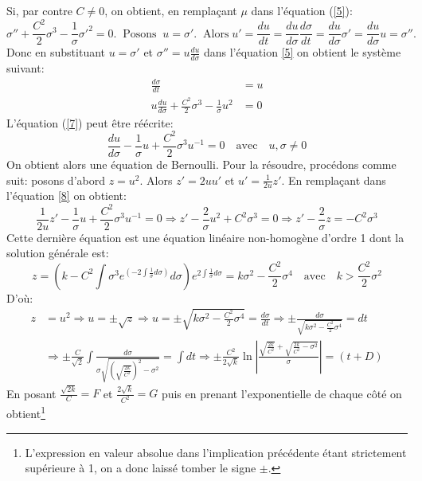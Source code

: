 \documentclass[11pt,french]{article}
\begin{document}
Si, par contre $C\neq 0$, on obtient, en remplaçant $\mu$ dans l'équation (\ref{5}): 
\begin{equation*}
   \sigma''+\frac{C^2}{2}\sigma^3-\frac{1}{\sigma}\sigma'^2=0.\;\;\text{Posons}\;\;u=\sigma'.\;\;\text{Alors}\;u'=\frac{du}{dt}=\frac{du}{d\sigma}\frac{d\sigma}{dt}=\frac{du}{d\sigma}\sigma'=\frac{du}{d\sigma}u=\sigma''.
\end{equation*}
Donc en substituant $u=\sigma'$ et $\sigma''=u\frac{du}{d\sigma}$ dans l'équation \eqref{5} on obtient le système suivant:
\begin{align}
    \frac{d\sigma}{dt}&=u\label{6}\\
    u\frac{du}{d\sigma}+\frac{C^2}{2}\sigma^3-\frac{1}{\sigma}u^2&=0\label{7} 
\end{align}
L'équation (\ref{7}) peut être réécrite:
\begin{equation}
    \frac{du}{d\sigma}-\frac{1}{\sigma}u+\frac{C^2}{2}\sigma^3u^{-1}=0\label{8}\quad\text{avec}\quad u, \sigma\neq0
\end{equation}
On obtient alors une équation de Bernoulli. Pour la résoudre, procédons comme suit: posons d'abord $z=u^2$. Alors $z'=2uu'$ et $u'=\frac{1}{2u}z'$. En remplaçant dans l'équation \eqref{8}  on obtient:
\begin{equation*} 
    \frac{1}{2u}z'-\frac{1}{\sigma}u+\frac{C^2}{2}\sigma^3u^{-1}=0\Longrightarrow z'-\frac{2}{\sigma}u^2+C^2\sigma^3=0\Longrightarrow z'-\frac{2}{\sigma}z=-C^2\sigma^3
\end{equation*}
Cette dernière équation est une équation linéaire non-homogène d'ordre 1 dont la solution générale est:
\begin{equation*}
    z=\left(k-C^2\int\sigma^3e^{\left(-2\int\frac{1}{\sigma}d\sigma\right)}d\sigma\right)e^{2\int\frac{1}{\sigma}d\sigma}=k\sigma^2-\frac{C^2}{2}\sigma^4\quad\text{avec}\quad k>\frac{C^2}{2}\sigma^2
\end{equation*}
D'où:
\begin{align*}
   z&=u^2\Longrightarrow u=\pm\sqrt{z}\Longrightarrow u=\pm\sqrt{k\sigma^2-\frac{C^2}{2}\sigma^4}=\frac{d\sigma}{dt}\Longrightarrow\pm\frac{d\sigma}{\sqrt{k\sigma^2-\frac{C^2}{2}\sigma^4}}=dt\\
   &\Longrightarrow\pm\frac{C}{\sqrt{2}}\int\frac{d\sigma}{\sigma\sqrt{\left(\sqrt{\frac{2k}{C^2}}\right)^2-\sigma^2}}=\int dt\Longrightarrow\pm\frac{C^2}{2\sqrt{k}}\ln\left|\frac{\sqrt{\frac{2k}{C^2}}+\sqrt{\frac{2k}{C^2}-\sigma^2}}{\sigma}\right|=(t+D)
\end{align*}
En posant $\frac{\sqrt{2k}}{C}=F$ et $\frac{2\sqrt{k}}{C^2}=G$ puis en prenant l'exponentielle de chaque côté on obtient\footnote{L'expression en valeur absolue dans l'implication précédente étant strictement supérieure à 1, on a donc laissé tomber le signe $\pm$.}
\end{document}
